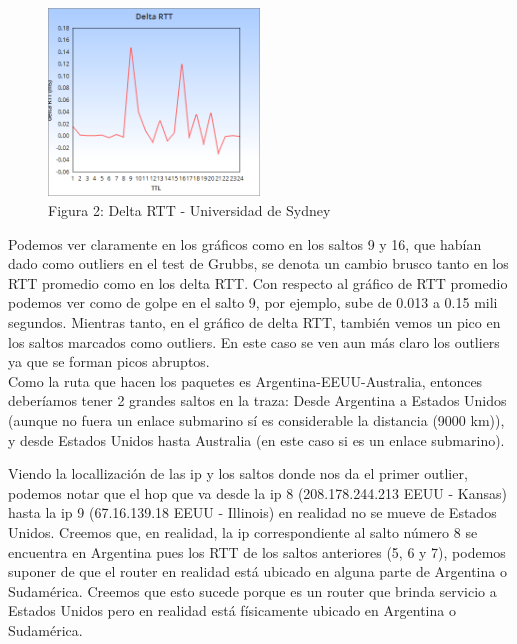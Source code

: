\begin{figure}[h]
	\begin{center}
    \includegraphics[width=0.5\textwidth]{img_analisis2/Delta_RTT.png}
     \caption{Figura 2: Delta RTT - Universidad de Sydney} 
	\end{center} 
\end{figure}
\vspace{0.25cm}


Podemos ver claramente en los gr\'aficos como en los saltos 9 y 16, que hab\'ian dado como outliers en el test de Grubbs, se denota un cambio brusco tanto en los RTT promedio como en los delta RTT. Con respecto al gr\'afico de RTT promedio podemos ver como de golpe en el salto 9, por ejemplo, sube de 0.013 a 0.15 mili segundos. Mientras tanto, en el gr\'afico de delta RTT, tambi\'en vemos un pico en los saltos marcados como outliers. En este caso se ven aun m\'as claro los outliers ya que se forman picos abruptos.\\
Como la ruta que hacen los paquetes es Argentina-EEUU-Australia, entonces deber\'iamos tener 2 grandes saltos en la traza: Desde Argentina a Estados Unidos (aunque no fuera un enlace submarino s\'i es considerable la distancia (9000 km)), y desde Estados Unidos hasta Australia (en este caso si es un enlace submarino). \newline

Viendo la locallizaci\'on de las ip y los saltos donde nos da el primer outlier, podemos notar que el hop que va desde la  ip 8 (208.178.244.213  EEUU - Kansas) hasta la ip 9 (67.16.139.18     EEUU - Illinois) en realidad no se mueve de Estados Unidos. Creemos que, en realidad, la ip correspondiente al salto n\'umero 8 se encuentra en Argentina pues los RTT de los saltos anteriores (5, 6 y 7), podemos suponer de que el router en realidad est\'a ubicado en alguna parte de Argentina o Sudam\'erica. Creemos que esto sucede porque es un router que brinda servicio a Estados Unidos pero en realidad est\'a f\'isicamente ubicado en Argentina o Sudam\'erica.  \newline

